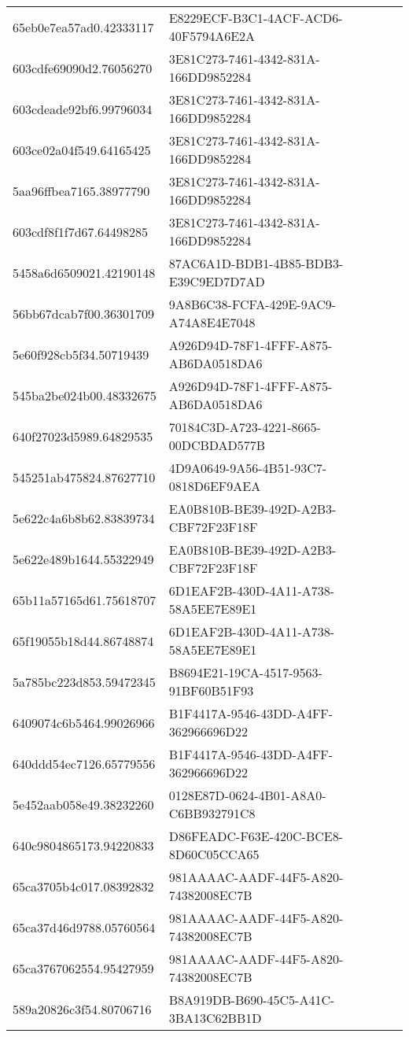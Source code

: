 \begin{tabular}{ll}
65eb0e7ea57ad0.42333117 & E8229ECF-B3C1-4ACF-ACD6-40F5794A6E2A \\
603cdfe69090d2.76056270 & 3E81C273-7461-4342-831A-166DD9852284 \\
603cdeade92bf6.99796034 & 3E81C273-7461-4342-831A-166DD9852284 \\
603ce02a04f549.64165425 & 3E81C273-7461-4342-831A-166DD9852284 \\
5aa96ffbea7165.38977790 & 3E81C273-7461-4342-831A-166DD9852284 \\
603cdf8f1f7d67.64498285 & 3E81C273-7461-4342-831A-166DD9852284 \\
5458a6d6509021.42190148 & 87AC6A1D-BDB1-4B85-BDB3-E39C9ED7D7AD \\
56bb67dcab7f00.36301709 & 9A8B6C38-FCFA-429E-9AC9-A74A8E4E7048 \\
5e60f928cb5f34.50719439 & A926D94D-78F1-4FFF-A875-AB6DA0518DA6 \\
545ba2be024b00.48332675 & A926D94D-78F1-4FFF-A875-AB6DA0518DA6 \\
640f27023d5989.64829535 & 70184C3D-A723-4221-8665-00DCBDAD577B \\
545251ab475824.87627710 & 4D9A0649-9A56-4B51-93C7-0818D6EF9AEA \\
5e622c4a6b8b62.83839734 & EA0B810B-BE39-492D-A2B3-CBF72F23F18F \\
5e622e489b1644.55322949 & EA0B810B-BE39-492D-A2B3-CBF72F23F18F \\
65b11a57165d61.75618707 & 6D1EAF2B-430D-4A11-A738-58A5EE7E89E1 \\
65f19055b18d44.86748874 & 6D1EAF2B-430D-4A11-A738-58A5EE7E89E1 \\
5a785bc223d853.59472345 & B8694E21-19CA-4517-9563-91BF60B51F93 \\
6409074c6b5464.99026966 & B1F4417A-9546-43DD-A4FF-362966696D22 \\
640ddd54ec7126.65779556 & B1F4417A-9546-43DD-A4FF-362966696D22 \\
5e452aab058e49.38232260 & 0128E87D-0624-4B01-A8A0-C6BB932791C8 \\
640c9804865173.94220833 & D86FEADC-F63E-420C-BCE8-8D60C05CCA65 \\
65ca3705b4c017.08392832 & 981AAAAC-AADF-44F5-A820-74382008EC7B \\
65ca37d46d9788.05760564 & 981AAAAC-AADF-44F5-A820-74382008EC7B \\
65ca3767062554.95427959 & 981AAAAC-AADF-44F5-A820-74382008EC7B \\
589a20826c3f54.80706716 & B8A919DB-B690-45C5-A41C-3BA13C62BB1D \\

\end{tabular}
